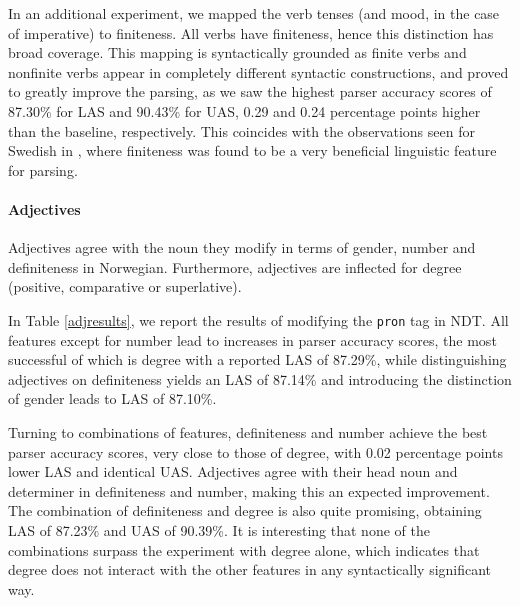 \documentclass[11pt,a4paper]{article}
\begin{document}
In an additional experiment, we mapped the verb tenses (and mood, in the case
of imperative) to finiteness. All verbs have finiteness, hence this distinction
has broad coverage. This mapping is syntactically grounded as finite verbs and
nonfinite verbs appear in completely different syntactic constructions, and
proved to greatly improve the parsing, as we saw the highest parser accuracy
scores of 87.30\% for LAS and 90.43\% for UAS, 0.29 and 0.24 percentage points
higher than the baseline, respectively. This coincides with the observations
seen for Swedish in , where finiteness was found
to be a very beneficial linguistic feature for parsing.

\paragraph{Adjectives}
Adjectives agree with the noun they modify in terms of gender, number and
definiteness in Norwegian. Furthermore, adjectives are inflected for
degree (positive, comparative or superlative).

In Table \ref{adjresults}, we report the results of modifying the \texttt{pron}
tag in NDT. All features except for number lead to increases in parser accuracy
scores, the most successful of which is degree with a reported LAS of 87.29\%,
while distinguishing adjectives on definiteness yields an LAS of 87.14\% and
introducing the distinction of gender leads to LAS of 87.10\%.


Turning to combinations of features, definiteness and number achieve the best
parser accuracy scores, very close to those of degree, with 0.02 percentage
points lower LAS and identical UAS. Adjectives agree with their head noun and
determiner in definiteness and number, making this an expected improvement. The
combination of definiteness and degree is also quite promising, obtaining LAS
of 87.23\% and UAS of 90.39\%. It is interesting that none of the combinations
surpass the experiment with degree alone, which indicates that degree does not
interact with the other features in any syntactically significant way.
\end{document}
